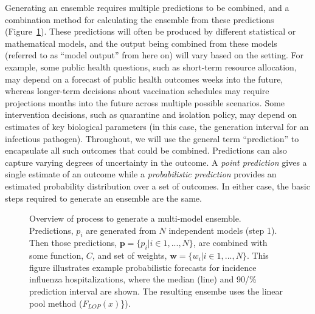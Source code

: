 \documentclass[
  letterpaper,
  DIV=11,
  numbers=noendperiod]{scrartcl}
\begin{document}
Generating an ensemble requires multiple predictions to be combined, and
a combination method for calculating the ensemble from these predictions
(Figure~\ref{fig-ensemble-schematic}). These predictions will often be
produced by different statistical or mathematical models, and the output
being combined from these models (referred to as ``model output'' from
here on) will vary based on the setting. For example, some public health
questions, such as short-term resource allocation, may depend on a
forecast of public health outcomes weeks into the future, whereas
longer-term decisions about vaccination schedules may require
projections months into the future across multiple possible scenarios.
Some intervention decisions, such as quarantine and isolation policy,
may depend on estimates of key biological parameters (in this case, the
generation interval for an infectious pathogen). Throughout, we will use
the general term ``prediction'' to encapsulate all such outcomes that
could be combined. Predictions can also capture varying degrees of
uncertainty in the outcome. A \emph{point prediction} gives a single
estimate of an outcome while a \emph{probabilistic prediction} provides
an estimated probability distribution over a set of outcomes. In either
case, the basic steps required to generate an ensemble are the same.

\begin{figure}


\caption{\label{fig-ensemble-schematic}Overview of process to generate a
multi-model ensemble. Predictions, \(p_i\) are generated from \(N\)
independent models (step 1). Then those predictions,
\(\pmb{p} = \{p_i|i \in 1, ..., N\}\), are combined with some function,
\(C\), and set of weights, \(\pmb{w} = \{w_i|i \in 1, ..., N\}\). This
figure illustrates example probabilistic forecasts for incidence
influenza hospitalizations, where the median (line) and 90/\% prediction
interval are shown. The resulting ensembe uses the linear pool method
(\(F_{LOP}(x)\)\}).}

\end{figure}%
\end{document}
